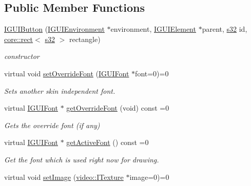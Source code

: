 \subsection*{Public Member Functions}
\begin{DoxyCompactItemize}
\item 
\mbox{\label{classirr_1_1gui_1_1IGUIButton_a9ce8f3172c2c82269c2cf6a650ccaaa8}} 
\hyperlink{classirr_1_1gui_1_1IGUIButton_a9ce8f3172c2c82269c2cf6a650ccaaa8}{I\+G\+U\+I\+Button} (\hyperlink{classirr_1_1gui_1_1IGUIEnvironment}{I\+G\+U\+I\+Environment} $\ast$environment, \hyperlink{classirr_1_1gui_1_1IGUIElement}{I\+G\+U\+I\+Element} $\ast$parent, \hyperlink{namespaceirr_ac66849b7a6ed16e30ebede579f9b47c6}{s32} id, \hyperlink{classirr_1_1core_1_1rect}{core\+::rect}$<$ \hyperlink{namespaceirr_ac66849b7a6ed16e30ebede579f9b47c6}{s32} $>$ rectangle)
\begin{DoxyCompactList}\small\item\em constructor \end{DoxyCompactList}\item 
virtual void \hyperlink{classirr_1_1gui_1_1IGUIButton_ab63c3536bd2eb92e9ebec8ea3a381ec1}{set\+Override\+Font} (\hyperlink{classirr_1_1gui_1_1IGUIFont}{I\+G\+U\+I\+Font} $\ast$font=0)=0
\begin{DoxyCompactList}\small\item\em Sets another skin independent font. \end{DoxyCompactList}\item 
virtual \hyperlink{classirr_1_1gui_1_1IGUIFont}{I\+G\+U\+I\+Font} $\ast$ \hyperlink{classirr_1_1gui_1_1IGUIButton_adbc27c7589bf22d2a7fa676401358578}{get\+Override\+Font} (void) const =0
\begin{DoxyCompactList}\small\item\em Gets the override font (if any) \end{DoxyCompactList}\item 
virtual \hyperlink{classirr_1_1gui_1_1IGUIFont}{I\+G\+U\+I\+Font} $\ast$ \hyperlink{classirr_1_1gui_1_1IGUIButton_a1caa9253c284c3e3366733bf7805d762}{get\+Active\+Font} () const =0
\begin{DoxyCompactList}\small\item\em Get the font which is used right now for drawing. \end{DoxyCompactList}\item 
virtual void \hyperlink{classirr_1_1gui_1_1IGUIButton_af233578beb34ba115b0197731e34a3f1}{set\+Image} (\hyperlink{classirr_1_1video_1_1ITexture}{video\+::\+I\+Texture} $\ast$image=0)=0

\end{DoxyCompactItemize}
